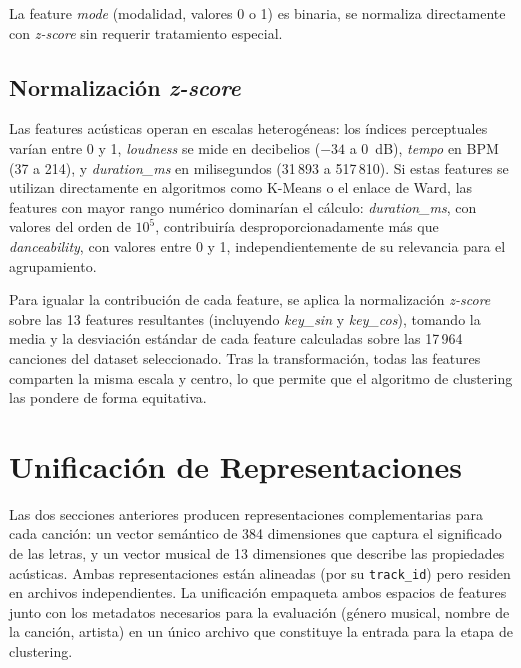 La feature \textit{mode} (modalidad, valores 0 o 1) es binaria, se normaliza directamente con \textit{z-score} sin requerir tratamiento especial.

\subsection{Normalización \textit{z-score}}
\label{subsec:normalizacion-zscore}

Las features acústicas operan en escalas heterogéneas: los índices perceptuales varían entre 0 y 1, \textit{loudness} se mide en decibelios ($-34$ a 0~dB), \textit{tempo} en BPM (37 a 214), y \textit{duration\_ms} en milisegundos (31\,893 a 517\,810). Si estas features se utilizan directamente en algoritmos como K-Means o el enlace de Ward, las features con mayor rango numérico dominarían el cálculo: \textit{duration\_ms}, con valores del orden de $10^5$, contribuiría desproporcionadamente más que \textit{danceability}, con valores entre 0 y 1, independientemente de su relevancia para el agrupamiento.

Para igualar la contribución de cada feature, se aplica la normalización \textit{z-score} sobre las 13 features resultantes (incluyendo \textit{key\_sin} y \textit{key\_cos}), tomando la media y la desviación estándar de cada feature calculadas sobre las 17\,964 canciones del dataset seleccionado. Tras la transformación, todas las features comparten la misma escala y centro, lo que permite que el algoritmo de clustering las pondere de forma equitativa.



\FloatBarrier

\section{Unificación de Representaciones}
\label{sec:unificacion}

Las dos secciones anteriores producen representaciones complementarias para cada canción: un vector semántico de 384 dimensiones que captura el significado de las letras, y un vector musical de 13 dimensiones que describe las propiedades acústicas. Ambas representaciones están alineadas (por su \texttt{track\_id}) pero residen en archivos independientes. La unificación empaqueta ambos espacios de features junto con los metadatos necesarios para la evaluación (género musical, nombre de la canción, artista) en un único archivo que constituye la entrada para la etapa de clustering.

